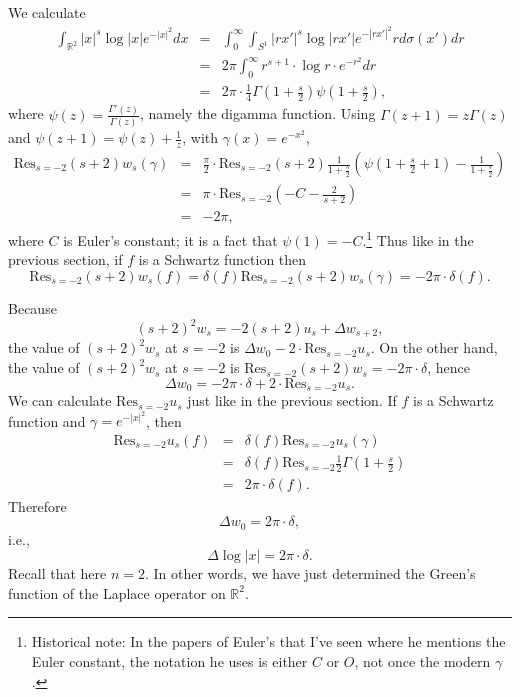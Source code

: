 \documentclass{article}
\newcommand{\Res}{\textrm{Res}}
\begin{document}
We calculate
\begin{eqnarray*}
\int_{\mathbb{R}^2} |x|^s \log |x| e^{-|x|^2} dx&=&\int_0^\infty \int_{S^1} |rx'|^s \log |rx'| e^{-|rx'|^2} r d\sigma(x') dr\\
&=&2\pi \int_0^\infty r^{s+1} \cdot \log r \cdot e^{-r^2} dr\\
&=&2\pi \cdot \frac{1}{4}\Gamma\left(1+\frac{s}{2} \right) \psi\left(1+\frac{s}{2}\right),
\end{eqnarray*}
where $\psi(z)=\frac{\Gamma'(z)}{\Gamma(z)}$, namely the digamma function. 
Using $\Gamma(z+1)=z\Gamma(z)$ and $\psi(z+1)=\psi(z)+\frac{1}{z}$, with $\gamma(x)=e^{-x^2}$,
\begin{eqnarray*}
\Res_{s=-2} (s+2) w_s(\gamma)&=&\frac{\pi}{2} \cdot \Res_{s=-2} (s+2) \frac{1}{1+\frac{s}{2}} \left(\psi\left(1+\frac{s}{2}+1\right)-\frac{1}{1+\frac{s}{2}} \right)\\
&=&\pi \cdot \Res_{s=-2} \left(-C-\frac{2}{s+2}\right)\\
&=&-2\pi,
\end{eqnarray*}
where $C$ is Euler's constant; it is a fact that $\psi(1)=-C$.\footnote{Historical note: In the papers of Euler's that I've seen where he mentions
the Euler constant, the notation he uses is either $C$ or $O$, not once the modern $\gamma$.}
Thus like in the previous section, if $f$ is a Schwartz function then
\[
\Res_{s=-2} (s+2) w_s(f)=\delta(f) \Res_{s=-2} (s+2)w_s(\gamma)=-2\pi \cdot \delta(f).
\]

Because
\[
(s+2)^2w_s=-2(s+2) u_s + \Delta w_{s+2},
\]
 the value of $(s+2)^2 w_s$ at $s=-2$ is $\Delta w_0 - 2 \cdot \Res_{s=-2} u_{s}$. On the other hand, the value of $(s+2)^2 w_s$ at $s=-2$ is
$\Res_{s=-2} (s+2) w_s=-2\pi\cdot \delta$, hence
\[
\Delta w_0 =-2\pi \cdot \delta +  2 \cdot \Res_{s=-2} u_{s}.
\]
We can calculate $\Res_{s=-2} u_s$ just like in the previous section. If $f$ is a Schwartz function and $\gamma=e^{-|x|^2}$, then
\begin{eqnarray*}
\Res_{s=-2} u_s(f)&=&\delta(f) \Res_{s=-2} u_s(\gamma)\\
&=&\delta(f) \Res_{s=-2} \frac{1}{2}\Gamma\left(1+\frac{s}{2}\right)\\
&=&2\pi \cdot \delta(f).
\end{eqnarray*}
Therefore
\[
\Delta w_0 = 2\pi \cdot \delta,
\]
i.e.,
\[
\Delta \log |x| = 2\pi \cdot \delta.
\]
Recall that here $n=2$. 
In other words, we have just determined the Green's function of the Laplace operator on $\mathbb{R}^2$.
\end{document}
